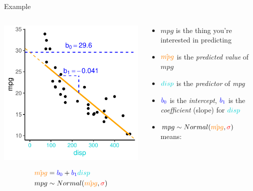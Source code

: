 \documentclass[
  ignorenonframetext,
  aspectratio=169]{beamer}
\providecommand{\tightlist}{%
  \setlength{\itemsep}{0pt}\setlength{\parskip}{0pt}}
\begin{document}
\begin{frame}{Example}
\protect\hypertarget{example}{}
\begin{columns}[T]
\begin{column}{0.48\textwidth}
\includegraphics{03-Lecture_files/figure-beamer/unnamed-chunk-1-1.pdf}

\begin{equation*} 
\begin{split}
\textcolor{orange}{\hat{mpg}} & = \textcolor{blue}{b_0} + \textcolor{blue}{b_1}\textcolor{darkturquoise}{disp} \\
mpg & \sim Normal(\textcolor{orange}{\hat{mpg}},\textcolor{red}{\sigma})
\end{split}
\end{equation*}
\end{column}

\begin{column}{0.48\textwidth}
\begin{itemize}[<+->]
\tightlist
\item
  \(mpg\) is the thing you're interested in predicting
\item
  \(\textcolor{orange}{\hat{mpg}}\) is the \emph{predicted value} of
  \(mpg\)
\item
  \(\textcolor{darkturquoise}{disp}\) is the \emph{predictor} of
  \emph{mpg}
\item
  \(\textcolor{blue}{b_0}\) is the \emph{intercept},
  \(\textcolor{blue}{b_1}\) is the \emph{coefficient} (slope) for
  \(\textcolor{darkturquoise}{disp}\)
\item
  \(mpg\sim Normal(\textcolor{orange}{\hat{mpg}},\textcolor{red}{\sigma})\)
  means:


\end{itemize}
\end{column}
\end{columns}
\end{frame}
\end{document}

